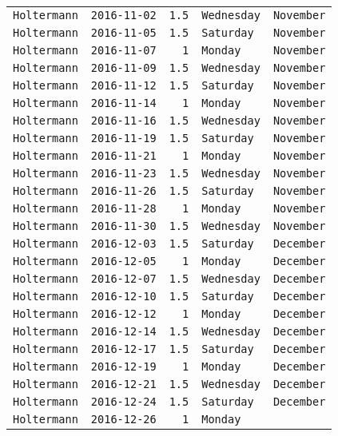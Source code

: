 \documentclass[11pt,A4paper,]{article}
\begin{document}
\begin{longtable}[]{@{}lrrll@{}}
\texttt{Holtermann} & \texttt{2016-11-02} & \texttt{1.5} &
\texttt{Wednesday} & \texttt{November}\tabularnewline
\texttt{Holtermann} & \texttt{2016-11-05} & \texttt{1.5} &
\texttt{Saturday} & \texttt{November}\tabularnewline
\texttt{Holtermann} & \texttt{2016-11-07} & \texttt{1} & \texttt{Monday}
& \texttt{November}\tabularnewline
\texttt{Holtermann} & \texttt{2016-11-09} & \texttt{1.5} &
\texttt{Wednesday} & \texttt{November}\tabularnewline
\texttt{Holtermann} & \texttt{2016-11-12} & \texttt{1.5} &
\texttt{Saturday} & \texttt{November}\tabularnewline
\texttt{Holtermann} & \texttt{2016-11-14} & \texttt{1} & \texttt{Monday}
& \texttt{November}\tabularnewline
\texttt{Holtermann} & \texttt{2016-11-16} & \texttt{1.5} &
\texttt{Wednesday} & \texttt{November}\tabularnewline
\texttt{Holtermann} & \texttt{2016-11-19} & \texttt{1.5} &
\texttt{Saturday} & \texttt{November}\tabularnewline
\texttt{Holtermann} & \texttt{2016-11-21} & \texttt{1} & \texttt{Monday}
& \texttt{November}\tabularnewline
\texttt{Holtermann} & \texttt{2016-11-23} & \texttt{1.5} &
\texttt{Wednesday} & \texttt{November}\tabularnewline
\texttt{Holtermann} & \texttt{2016-11-26} & \texttt{1.5} &
\texttt{Saturday} & \texttt{November}\tabularnewline
\texttt{Holtermann} & \texttt{2016-11-28} & \texttt{1} & \texttt{Monday}
& \texttt{November}\tabularnewline
\texttt{Holtermann} & \texttt{2016-11-30} & \texttt{1.5} &
\texttt{Wednesday} & \texttt{November}\tabularnewline
\texttt{Holtermann} & \texttt{2016-12-03} & \texttt{1.5} &
\texttt{Saturday} & \texttt{December}\tabularnewline
\texttt{Holtermann} & \texttt{2016-12-05} & \texttt{1} & \texttt{Monday}
& \texttt{December}\tabularnewline
\texttt{Holtermann} & \texttt{2016-12-07} & \texttt{1.5} &
\texttt{Wednesday} & \texttt{December}\tabularnewline
\texttt{Holtermann} & \texttt{2016-12-10} & \texttt{1.5} &
\texttt{Saturday} & \texttt{December}\tabularnewline
\texttt{Holtermann} & \texttt{2016-12-12} & \texttt{1} & \texttt{Monday}
& \texttt{December}\tabularnewline
\texttt{Holtermann} & \texttt{2016-12-14} & \texttt{1.5} &
\texttt{Wednesday} & \texttt{December}\tabularnewline
\texttt{Holtermann} & \texttt{2016-12-17} & \texttt{1.5} &
\texttt{Saturday} & \texttt{December}\tabularnewline
\texttt{Holtermann} & \texttt{2016-12-19} & \texttt{1} & \texttt{Monday}
& \texttt{December}\tabularnewline
\texttt{Holtermann} & \texttt{2016-12-21} & \texttt{1.5} &
\texttt{Wednesday} & \texttt{December}\tabularnewline
\texttt{Holtermann} & \texttt{2016-12-24} & \texttt{1.5} &
\texttt{Saturday} & \texttt{December}\tabularnewline
\texttt{Holtermann} & \texttt{2016-12-26} & \texttt{1} & \texttt{Monday}

\end{longtable}
\end{document}
